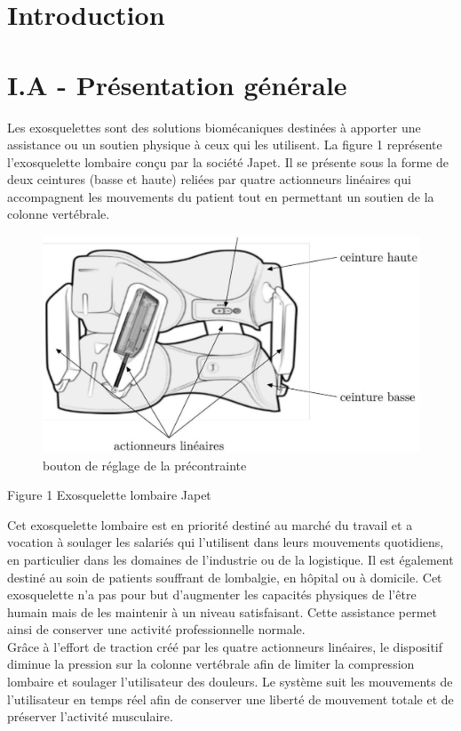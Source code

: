 \documentclass[10pt]{article}
\begin{document}
\captionsetup{singlelinecheck=false}
\section{Introduction}
\section{I.A - Présentation générale}
Les exosquelettes sont des solutions biomécaniques destinées à apporter une assistance ou un soutien physique à ceux qui les utilisent. La figure 1 représente l'exosquelette lombaire conçu par la société Japet. Il se présente sous la forme de deux ceintures (basse et haute) reliées par quatre actionneurs linéaires qui accompagnent les mouvements du patient tout en permettant un soutien de la colonne vertébrale.

\begin{figure}[h]
\begin{center}
\captionsetup{labelformat=empty}
\caption{bouton de réglage de la précontrainte}
  \includegraphics[width=\textwidth]{2025_09_16_5f2d7643f7e649c6833dg-01}
\end{center}
\end{figure}

Figure 1 Exosquelette lombaire Japet

Cet exosquelette lombaire est en priorité destiné au marché du travail et a vocation à soulager les salariés qui l'utilisent dans leurs mouvements quotidiens, en particulier dans les domaines de l'industrie ou de la logistique. Il est également destiné au soin de patients souffrant de lombalgie, en hôpital ou à domicile. Cet exosquelette n'a pas pour but d'augmenter les capacités physiques de l'être humain mais de les maintenir à un niveau satisfaisant. Cette assistance permet ainsi de conserver une activité professionnelle normale.\\
Grâce à l'effort de traction créé par les quatre actionneurs linéaires, le dispositif diminue la pression sur la colonne vertébrale afin de limiter la compression lombaire et soulager l'utilisateur des douleurs. Le système suit les mouvements de l'utilisateur en temps réel afin de conserver une liberté de mouvement totale et de préserver l'activité musculaire.
\end{document}
